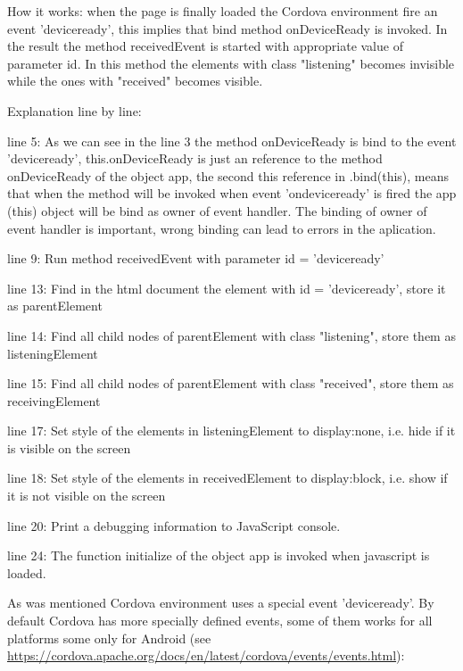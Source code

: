 \begin{explain}
How it works: when the page is finally loaded the Cordova environment fire an event 'deviceready', this implies that bind method onDeviceReady is invoked. In the result the method receivedEvent is started with appropriate value of parameter id. In this method the elements with class "listening" becomes invisible while the ones with "received" becomes visible.

Explanation line by line:
\begin{description}
\item{line 5:} As we can see in the line 3 the method onDeviceReady is bind to the event 'deviceready', this.onDeviceReady is just an reference to the method onDeviceReady of the object app, the second this reference in .bind(this), means that when the method will be invoked when event 'ondeviceready' is fired the app (this) object will be bind as owner of event handler. The binding of owner of event handler is important, wrong binding can lead to errors in the aplication.
\item{line 9:} Run method receivedEvent with parameter id = 'deviceready'
\item{line 13:} Find in the html document the element with id = 'deviceready', store it as parentElement
\item{line 14:} Find all child nodes of parentElement with class "listening", store them as listeningElement
\item{line 15:} Find all child nodes of parentElement with class "received", store them as receivingElement
\item{line 17:} Set style of the elements in listeningElement to display:none, i.e. hide if it is visible on the screen
\item{line 18:} Set style of the elements in receivedElement to display:block, i.e. show if it is not visible on the screen
\item{line 20:} Print a debugging information to JavaScript console.
\item{line 24:} The function initialize of the object app is invoked when javascript is loaded.
\end{description}
\end{explain}

As was mentioned Cordova environment uses a special event 'deviceready'. By default Cordova has more specially defined events, some of them works for all platforms some only for Android (see \url{https://cordova.apache.org/docs/en/latest/cordova/events/events.html}):

